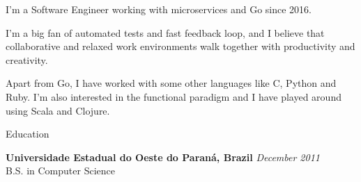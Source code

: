 \documentclass[
	a4paper, %
	11pt, %
]{resume} %
\begin{document}

\begin{rSection}{}

I’m a Software Engineer working with microservices and Go since 2016.

I'm a big fan of automated tests and fast feedback loop, and I believe that collaborative and relaxed work environments walk together with productivity and creativity.


Apart from Go, I have worked with some other languages like C, Python and Ruby.
I'm also interested in the functional paradigm and I have played around using Scala and Clojure.


\end{rSection}


\begin{rSection}{Education}

	\textbf{Universidade Estadual do Oeste do Paraná, Brazil} \hfill \textit{December 2011} \\
	B.S. in Computer Science

\end{rSection}


\end{document}
